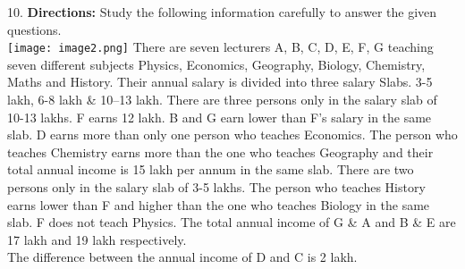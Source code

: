 \documentclass[
]{article}
\begin{document}
10. \textbf{Directions:} Study the following information carefully to answer the given questions.\\
\texttt{[image: image2.png]}
There are seven lecturers A, B, C, D, E, F, G teaching seven different subjects Physics,
Economics, Geography, Biology, Chemistry, Maths and History. Their annual salary is
divided into three salary Slabs. 3-5 lakh, 6-8 lakh \& 10–13 lakh.
There are three persons only in the salary slab of 10-13 lakhs. F earns 12 lakh. B and G earn
lower than F’s salary in the same slab. D earns more than only one person who teaches
Economics. The person who teaches Chemistry earns more than the one who teaches
Geography and their total annual income is 15 lakh per annum in the same slab. There are
two persons only in the salary slab of 3-5 lakhs. The person who teaches History earns lower
than F and higher than the one who teaches Biology in the same slab. F does not teach
Physics. The total annual income of G \& A and B \& E are 17 lakh and 19 lakh respectively.\\
The difference between the annual income of D and C is 2 lakh.\\
\end{document}
